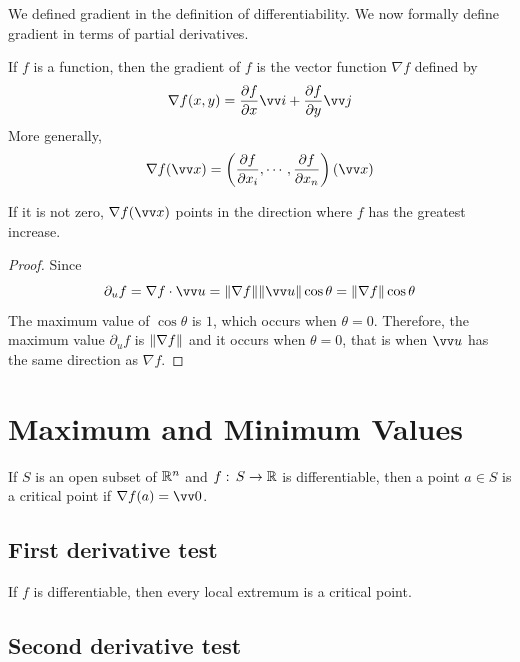 We defined gradient in the definition of differentiability. We now formally define gradient in terms of partial derivatives.

\begin{definition}[Gradient]
If $f$ is a function, then the gradient of $f$ is the vector function $\nabla f$ defined by
$$
\nabla f(x,y) = \partialderiv{f}{x}\vv i + \partialderiv{f}{y}\vv j
$$
More generally,
$$
\nabla f(\vv x) = \left(\partialderiv{f}{x_i},\cdots,\partialderiv{f}{x_n}\right) (\vv x)
$$
\end{definition}

\begin{theorem}
If it is not zero, $\nabla f(\vv x)$ points in the direction where $f$ has the greatest increase.

\begin{proof}
Since
$$
\partial_u f = \nabla f \cdot \vv u = \norm{\nabla f}\norm{\vv u}\cos\theta = \norm{\nabla f}\cos\theta
$$
The maximum value of $\cos\theta$ is $1$, which occurs when $\theta = 0$. Therefore, the maximum value $\partial_u f$ is $\lVert \nabla f \rVert$ and it occurs when $\theta = 0$, that is when $\vv u$ has the same direction as $\nabla f$.
\end{proof}
\end{theorem}

\section{Maximum and Minimum Values}

\begin{definition}
If $S$ is an open subset of ${\mathbb R}^n$ and $f:\, S \to {\mathbb R}$ is differentiable, then a point $a \in S$ is a critical point if $\nabla f(a)=\vv 0$.
\end{definition}

\subsection{First derivative test}

\begin{theorem}
If $f$ is differentiable, then every local extremum is a critical point.
\end{theorem}

\subsection{Second derivative test}

